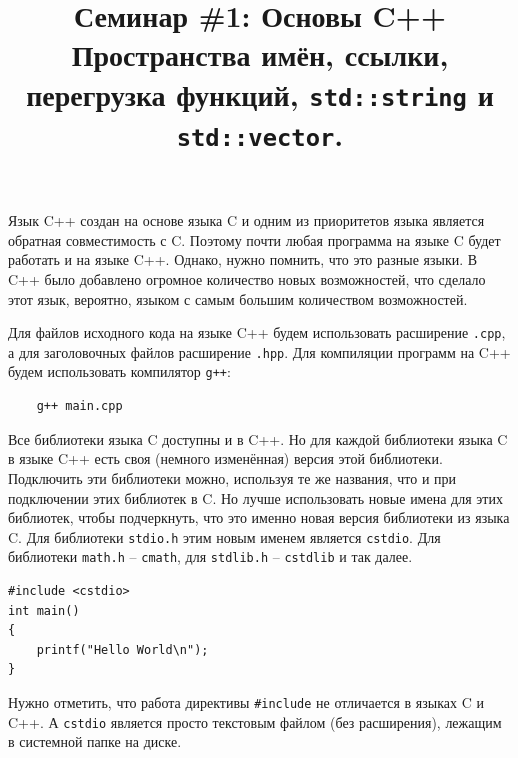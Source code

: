 \documentclass{article}
\begin{document}
\title{Семинар \#1: Основы C++ \\[1ex] \large Пространства имён, ссылки, перегрузка функций, \texttt{std::string} и \texttt{std::vector}. \vspace{-5ex}}\date{}\maketitle



Язык C++ создан на основе языка C и одним из приоритетов языка является обратная совместимость с C. Поэтому почти любая программа на языке C будет работать и на языке C++.
Однако, нужно помнить, что это разные языки. В C++ было добавлено огромное количество новых возможностей, что сделало этот язык, вероятно, языком с самым большим количеством возможностей.

Для файлов исходного кода на языке C++ будем использовать расширение \texttt{.cpp}, а для заголовочных файлов расширение \texttt{.hpp}. Для компиляции программ на C++ будем использовать компилятор \texttt{g++}:
\begin{verbatim}
    g++ main.cpp
\end{verbatim}
Все библиотеки языка C доступны и в C++. Но для каждой библиотеки языка C в языке C++ есть своя (немного изменённая) версия этой библиотеки. Подключить эти библиотеки можно, используя те же названия, что и при подключении этих библиотек в C.
Но лучше использовать новые имена для этих библиотек, чтобы подчеркнуть, что это именно новая версия библиотеки из языка C. Для библиотеки \texttt{stdio.h} этим новым именем является \texttt{cstdio}. Для библиотеки \texttt{math.h} -- \texttt{cmath}, для \texttt{stdlib.h} -- \texttt{cstdlib} и так далее.
\begin{lstlisting}
#include <cstdio>
int main() 
{
    printf("Hello World\n");
}
\end{lstlisting}
Нужно отметить, что работа директивы \texttt{\#include} не отличается в языках C и C++. А \texttt{cstdio} является просто текстовым файлом (без расширения), лежащим в системной папке на диске.
\end{document}
